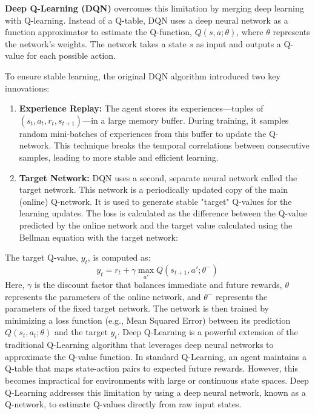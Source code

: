 \documentclass[16pt]{report}
\begin{document}
\textbf{Deep Q-Learning (DQN)} overcomes this limitation by merging deep learning with Q-learning. Instead of a Q-table, DQN uses a deep neural network as a function approximator to estimate the Q-function, $Q(s, a; \theta)$, where $\theta$ represents the network's weights. The network takes a state $s$ as input and outputs a Q-value for each possible action.

To ensure stable learning, the original DQN algorithm introduced two key innovations:
\begin{enumerate}
    \item \textbf{Experience Replay:} The agent stores its experiences—tuples of $(s_t, a_t, r_t, s_{t+1})$—in a large memory buffer. During training, it samples random mini-batches of experiences from this buffer to update the Q-network. This technique breaks the temporal correlations between consecutive samples, leading to more stable and efficient learning.
    \item \textbf{Target Network:} DQN uses a second, separate neural network called the target network. This network is a periodically updated copy of the main (online) Q-network. It is used to generate stable "target" Q-values for the learning updates. The loss is calculated as the difference between the Q-value predicted by the online network and the target value calculated using the Bellman equation with the target network:
\end{enumerate}

The target Q-value, $y_t$, is computed as:
\begin{equation}
y_t = r_t + \gamma \max_{a'} Q(s_{t+1}, a'; \theta^-)
\end{equation}
Here, $\gamma$ is the discount factor that balances immediate and future rewards, $\theta$ represents the parameters of the online network, and $\theta^-$ represents the parameters of the fixed target network. The network is then trained by minimizing a loss function (e.g., Mean Squared Error) between its prediction $Q(s_t, a_t; \theta)$ and the target $y_t$.
 Deep Q-Learning is a powerful extension of the traditional Q-Learning algorithm that leverages deep neural networks to approximate the Q-value function. In standard Q-Learning, an agent maintains a Q-table that maps state-action pairs to expected future rewards. However, this becomes impractical for environments with large or continuous state spaces. Deep Q-Learning addresses this limitation by using a deep neural network, known as a Q-network, to estimate Q-values directly from raw input states.
\end{document}
